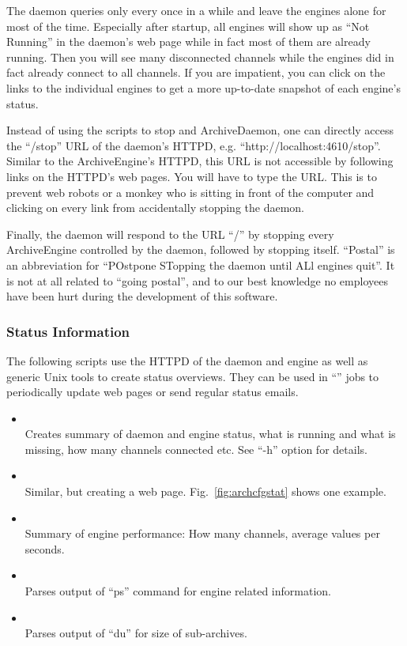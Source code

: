 \NOTE The daemon queries only every once in a while and leave the
engines alone for most of the time.
Especially after startup, all engines will show up as ``Not Running''
in the daemon's web page while in fact most of them are already
running. Then you will see many disconnected channels while the
engines did in fact already connect to all channels. 
If you are impatient, you can click on the links to the individual
engines to get a more up-to-date snapshot of each engine's status.

Instead of using the scripts to stop and ArchiveDaemon, one can
directly access the ``/stop'' URL of the daemon's HTTPD,
e.g. ``http://localhost:4610/stop''.  Similar to the ArchiveEngine's
HTTPD, this URL is not accessible by following links on the HTTPD's
web pages. You will have to type the URL. This is to prevent web
robots or a monkey who is sitting in front of the computer and
clicking on every link from accidentally stopping the daemon.

Finally, the daemon will respond to the URL ``/'' by stopping
every ArchiveEngine controlled by the daemon, followed by stopping
itself. ``Postal'' is an abbreviation for ``POstpone STopping the
daemon until ALl engines quit''. It is not at all related to ``going
postal'', and to our best knowledge no  employees have been hurt
during the development of this software.

\subsubsection{Status Information}
The following scripts use the HTTPD of the daemon and engine
as well as generic Unix tools to create status overviews.
They can be used in ``'' jobs to periodically update
web pages or send regular status emails.

\begin{itemize}
\item {} \\
      Creates summary of daemon and engine status,
      what is running and what is missing,
      how many channels connected etc.
      See ``-h'' option for details.
\item {} \\
      Similar, but creating a web page. Fig.~\ref{fig:archcfgstat}
      shows one example.
\item {} \\
      Summary of engine performance: How many channels, average values
      per seconds.
\item {} \\
      Parses output of ``ps'' command for engine related information.
\item {} \\
      Parses output of ``du'' for size of sub-archives.
\end{itemize}

